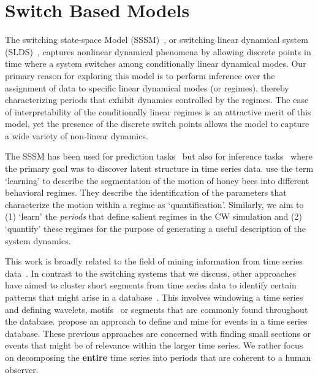 \section{Switch Based Models}
The switching state-space Model (SSSM)~\citep{ghahramani2000variational}, or switching linear dynamical system (SLDS)~\citep{fox2009nonparametric}, captures nonlinear dynamical phenomena by allowing discrete points in time where a system switches among conditionally linear dynamical modes. Our primary reason for exploring this model is to perform inference over the assignment of data to specific linear dynamical modes (or regimes), thereby characterizing periods that exhibit dynamics controlled by the regimes. The ease of interpretability of the conditionally linear regimes is an attractive merit of this model, yet the presence of the discrete switch points allows the model to capture a wide variety of non-linear dynamics.

The SSSM has been used for prediction tasks~\citep{fox2007hierarchical,li2003survey} but also for inference tasks~\citep{fox2009nonparametric,jonsen2007identifying,pavlovic2001learning} where the primary goal was to discover latent structure in time series data. \citet{oh2008learning} use the term `learning' to describe the segmentation of the motion of honey bees into different behavioral regimes. They describe the identification of the parameters that characterize the motion within a regime as `quantification'. Similarly, we aim to (1) `learn' the \textit{periods} that define salient regimes in the CW simulation and (2) `quantify' these regimes for the purpose of generating a useful description of the system dynamics.

This work is broadly related to the field of mining information from time series data~\citep{esling2012time,horst2004data}. In contrast to the switching systems that we discuss, other approaches have aimed to cluster short segments from time series data to identify certain patterns that might arise in a database~\citep{vlachos2003wavelet,tanaka2005discovery,patel2002mining}. This involves windowing a time series and defining wavelets, motifs~\citep{patel2002mining} or segments that are commonly found throughout the database. \cite{preston2009event} propose an approach to define and mine for events in a time series database. These previous approaches are concerned with finding small sections or events that might be of relevance within the larger time series. We rather focus on decomposing the \textbf{entire} time series into periods that are coherent to a human observer.

